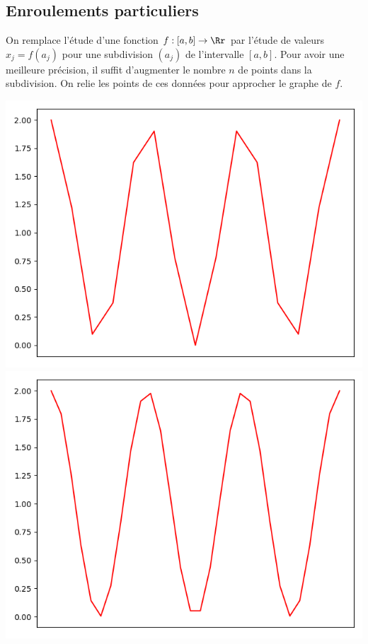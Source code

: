 \documentclass[11pt,class=report,crop=false]{standalone}
\begin{document}
\subsection{Enroulements particuliers}

On remplace l'étude d'une fonction $f : [a,b] \to \Rr$ par l'étude de valeurs $x_j=f(a_j)$ pour une subdivision $(a_j)$ de l'intervalle $[a,b]$. Pour avoir une meilleure précision, il suffit d'augmenter le nombre $n$ de points dans la subdivision.
On relie les points de ces données pour approcher le graphe de $f$.

\begin{center}
\includegraphics[scale=\myscale,scale=0.33]{figures/fourier-4a}
\includegraphics[scale=\myscale,scale=0.33]{figures/fourier-4b}

\end{center}
\end{document}
